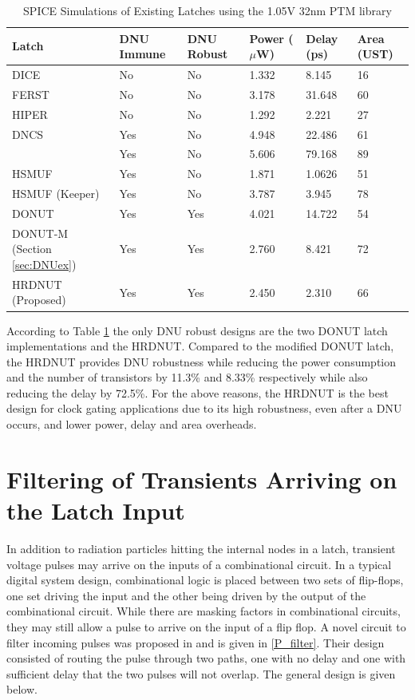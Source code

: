 \begin{table}[h]
	\begin{center}
		\caption{SPICE Simulations of Existing Latches using the 1.05V 32nm PTM library }
		\label{table:rtable}
		\begin{tabular}{|m{8em}|m{5em}|m{5em}|m{3em}|m{3em}|m{3em}|}
			\hline
			Latch & DNU Immune & DNU Robust & Power ($\mu$W) & Delay (ps) & Area (UST)\\ 
			\hline
			DICE & No & No & 1.332 & 8.145 & 16 \\
			\hline
			FERST & No & No & 3.178 & 31.648 & 60 \\
			\hline
			HIPER & No & No & 1.292 & 2.221 & 27 \\
			\hhline{|=|=|=|=|=|=|}
			DNCS & Yes & No & 4.948 & 22.486 & 61 \\
			\hline
			\cite{Inter} & Yes & No & 5.606 & 79.168 & 89 \\
			\hline
			HSMUF & Yes & No & 1.871 & 1.0626 & 51 \\
			\hline
			HSMUF (Keeper) & Yes & No & 3.787 & 3.945 & 78 \\
			\hhline{|=|=|=|=|=|=|}
			DONUT \cite{DONUT} & Yes & Yes & 4.021 & 14.722 & 54 \\ 
			\hline
			DONUT-M \newline (Section \ref{sec:DNUex}) & Yes & Yes & 2.760 & 8.421 & 72\\
			\hline
			HRDNUT \newline (Proposed) & Yes & Yes & 2.450 & 2.310 & 66 \\
			\hline
		\end{tabular}
	\end{center}
\end{table}

According to Table \ref{table:rtable} the only DNU robust designs are the two DONUT latch implementations and the HRDNUT. Compared to the modified DONUT latch, the HRDNUT provides DNU robustness while reducing the power consumption and the number of transistors by 11.3\% and 8.33\% respectively while also reducing the delay by 72.5\%. For the above reasons, the HRDNUT is the best design for clock gating applications due to its high robustness, even after a DNU occurs, and lower power, delay and area overheads.

\section{Filtering of Transients Arriving on the Latch Input}
In addition to radiation particles hitting the internal nodes in a latch, transient voltage pulses may arrive on the inputs of a combinational circuit. In a typical digital system design, combinational logic is placed between two sets of flip-flops, one set driving the input and the other being driven by the output of the combinational circuit. While there are masking factors in combinational circuits, they may still allow a pulse to arrive on the input of a flip flop. A novel circuit to filter incoming pulses was proposed in \cite{FERST} and is given in \ref{P_filter}. Their design consisted of routing the pulse through two paths, one with no delay and one with sufficient delay that the two pulses will not overlap. The general design is given below.

